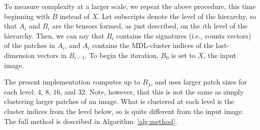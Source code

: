\documentclass[a4paper,fleqn]{cas-sc}
\theoremstyle{remark}
\begin{document}
To measure complexity at a larger scale, we repeat the above procedure, this time beginning with $B$ instead of $X$. Let subscripts denote the level of the hierarchy, so that $A_i$ and $B_i$ are the tensors formed, as just described, on the $i$th level of the hierarchy. Then, we can say that $B_i$ contains the signatures (i.e., counts vectors) of the patches in $A_i$, and $A_i$ contains the MDL-cluster indices of the last-dimension vectors in $B_{i-1}$. To begin the iteration, $B_0$ is set to $X$, the input image. 

The present implementation computes up to $B_4$, and uses larger patch sizes for each level: $4$, $8$, $16$, and $32$. Note, however, that this is not the same as simply clustering larger patches of an image. What is clustered at each level is the cluster indices from the level below, so is quite different from the input image. The full method is described in Algorithm~\ref{alg:method}. 

\end{document}
